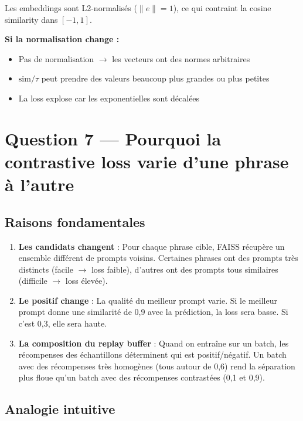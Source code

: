 \documentclass[11pt,a4paper]{article}
\begin{document}
Les embeddings sont L2-normalisés ($\|e\| = 1$), ce qui contraint la cosine similarity dans $[-1, 1]$.

\textbf{Si la normalisation change :}
\begin{itemize}
    \item Pas de normalisation $\rightarrow$ les vecteurs ont des normes arbitraires
    \item $\text{sim}/\tau$ peut prendre des valeurs beaucoup plus grandes ou plus petites
    \item La loss explose car les exponentielles sont décalées
\end{itemize}

\section{Question 7 — Pourquoi la contrastive loss varie d'une phrase à l'autre}

\subsection{Raisons fondamentales}

\begin{enumerate}
    \item \textbf{Les candidats changent} : Pour chaque phrase cible, FAISS récupère un ensemble différent de prompts voisins. Certaines phrases ont des prompts très distincts (facile $\rightarrow$ loss faible), d'autres ont des prompts tous similaires (difficile $\rightarrow$ loss élevée).
    
    \item \textbf{Le positif change} : La qualité du meilleur prompt varie. Si le meilleur prompt donne une similarité de 0{,}9 avec la prédiction, la loss sera basse. Si c'est 0{,}3, elle sera haute.
    
    \item \textbf{La composition du replay buffer} : Quand on entraîne sur un batch, les récompenses des échantillons déterminent qui est positif/négatif. Un batch avec des récompenses très homogènes (tous autour de 0{,}6) rend la séparation plus floue qu'un batch avec des récompenses contrastées (0{,}1 et 0{,}9).
\end{enumerate}

\subsection{Analogie intuitive}
\end{document}

